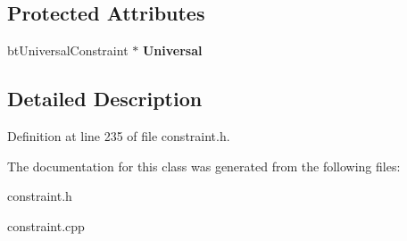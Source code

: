 \subsection*{Protected Attributes}
\begin{DoxyCompactItemize}
\item 
\hypertarget{classphys_1_1UniversalConstraint_ac05eed2dae4f659652d5a5ecd88bacf8}{
btUniversalConstraint $\ast$ {\bfseries Universal}}
\label{d0/d09/classphys_1_1UniversalConstraint_ac05eed2dae4f659652d5a5ecd88bacf8}

\end{DoxyCompactItemize}


\subsection{Detailed Description}


Definition at line 235 of file constraint.h.



The documentation for this class was generated from the following files:\begin{DoxyCompactItemize}
\item 
constraint.h\item 
constraint.cpp\end{DoxyCompactItemize}
